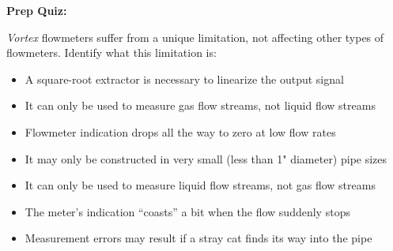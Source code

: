 \vfil \eject

\noindent
{\bf Prep Quiz:}

{\it Vortex} flowmeters suffer from a unique limitation, not affecting other types of flowmeters.  Identify what this limitation is:

\begin{itemize}
\item{} A square-root extractor is necessary to linearize the output signal
\vskip 5pt 
\item{} It can only be used to measure gas flow streams, not liquid flow streams 
\vskip 5pt 
\item{} Flowmeter indication drops all the way to zero at low flow rates
\vskip 5pt 
\item{} It may only be constructed in very small (less than 1" diameter) pipe sizes
\vskip 5pt 
\item{} It can only be used to measure liquid flow streams, not gas flow streams
\vskip 5pt 
\item{} The meter's indication ``coasts'' a bit when the flow suddenly stops
\vskip 5pt 
\item{} Measurement errors may result if a stray cat finds its way into the pipe
\end{itemize}





